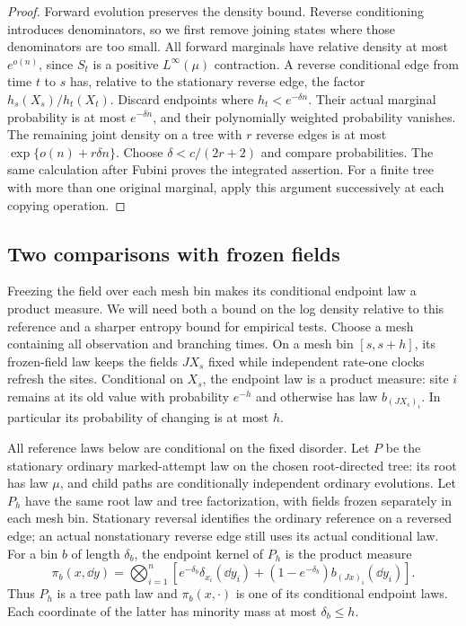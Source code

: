 \begin{proof}
Forward evolution preserves the density bound.  Reverse conditioning
introduces denominators, so we first remove joining states where those
denominators are too small.  All forward marginals have relative density
at most $e^{o(n)}$, since
$S_t$ is a positive $L^\infty(\mu)$ contraction.  A reverse conditional
edge from time $t$ to $s$ has, relative to the stationary reverse edge,
the factor $h_s(X_s)/h_t(X_t)$.  Discard endpoints where
$h_t<e^{-\delta n}$.  Their actual marginal probability is at most
$e^{-\delta n}$, and their polynomially weighted probability vanishes.
The remaining joint density on a tree with $r$ reverse edges is at most
$\exp\{o(n)+r\delta n\}$.  Choose $\delta<c/(2r+2)$ and compare
probabilities.  The same calculation after Fubini proves the integrated
assertion.  For a finite tree with more than one original marginal,
apply this argument successively at each copying operation.
\end{proof}

\subsection{Two comparisons with frozen fields}

Freezing the field over each mesh bin makes its conditional endpoint
law a product measure.  We will need both a bound on the log density
relative to this reference and a sharper entropy bound for empirical
tests.  Choose a mesh containing all observation and branching times.
On a mesh bin
$[s,s+h]$, its frozen-field law keeps the fields $JX_s$ fixed while
independent rate-one clocks refresh the sites.  Conditional on $X_s$,
the endpoint law is a product measure: site $i$ remains at its old
value with probability $e^{-h}$ and otherwise has law $b_{(JX_s)_i}$.
In particular its probability of changing is at most $h$.

All reference laws below are conditional on the fixed disorder.
Let $P$ be the stationary ordinary marked-attempt law on the chosen
root-directed tree: its root has law $\mu$, and child paths are
conditionally independent ordinary evolutions.  Let $P_h$ have the
same root law and tree factorization, with fields frozen separately
in each mesh bin.  Stationary reversal identifies the ordinary
reference on a reversed edge; an actual nonstationary reverse edge
still uses its actual conditional law.  For a bin $b$ of length
$\delta_b$, the endpoint kernel of $P_h$ is the product measure
\begin{equation}
 \pi_b(x,\dd y)=\bigotimes_{i=1}^n
 \left[e^{-\delta_b}\delta_{x_i}(\dd y_i)
   +(1-e^{-\delta_b})b_{(Jx)_i}(\dd y_i)\right].
 \label{eq:path-frozen-product-law}
\end{equation}
Thus $P_h$ is a tree path law and $\pi_b(x,\cdot)$ is one of its
conditional endpoint laws.  Each coordinate of the latter has minority
mass at most $\delta_b\le h$.

